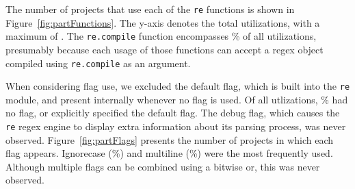 

The number of projects that use each of the {\tt re} functions is shown in Figure~\ref{fig:partFunctions}.  The y-axis denotes the total utilizations, with a maximum of . The {\tt re.compile} function encompasses \% of all utilizations, presumably because each usage of those functions can accept a regex object compiled using {\tt re.compile} as an argument.

When considering flag use, we excluded the default flag, which is built into the {\tt re} module, and present internally whenever no flag is used.  Of all utlizations, \% had no flag, or explicitly specified the default flag.  The debug flag, which causes the {\tt re} regex engine to display extra information about its parsing process, was never observed.
 Figure~\ref{fig:partFlags} presents the number of projects in which each flag appears. Ignorecase (\%) and multiline (\%) were the most frequently used.   Although multiple flags can be combined using a bitwise or, this was never observed.



